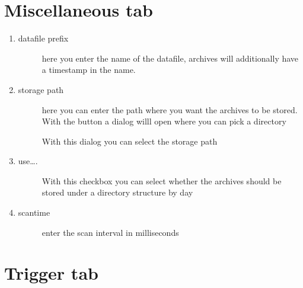 \documentclass[a4paper,10pt,english]{sphinxmanual}
\begin{document}
\chapter{Miscellaneous tab}
\label{\detokenize{misc:miscellaneous-tab}}\label{\detokenize{misc::doc}}
\begin{enumerate}
%
\item {} \begin{description}
\item[{datafile prefix}] \leavevmode
here you enter the name of the datafile, archives will additionally
have a timestamp in the name.

\end{description}

\item {} \begin{description}
\item[{storage path}] \leavevmode
here you can enter the path where you want the archives to be stored.
With the button a dialog willl open where you can pick a directory
\begin{quote}

\end{quote}

With this dialog you can select the storage path

\end{description}

\item {} \begin{description}
\item[{use….}] \leavevmode
With this checkbox you can select whether the archives should be stored under a directory structure by day

\end{description}

\item {} \begin{description}
\item[{scantime}] \leavevmode
enter the scan interval in milliseconds

\end{description}

\end{enumerate}


\chapter{Trigger tab}
\label{\detokenize{trigger:trigger-tab}}\label{\detokenize{trigger::doc}}
\end{document}
